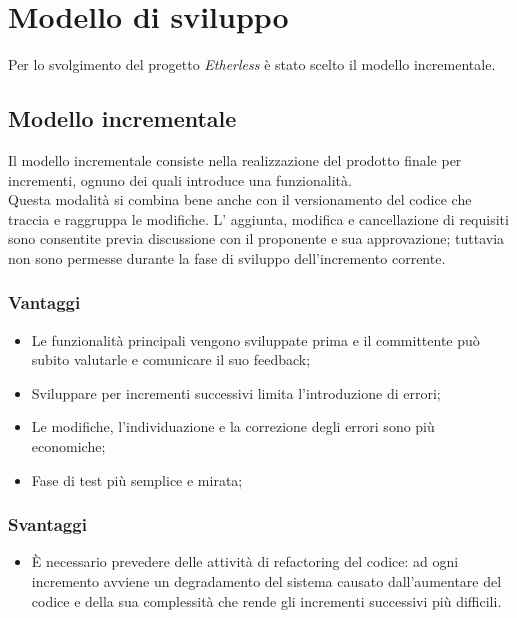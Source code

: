\section{Modello di sviluppo}
Per lo svolgimento del progetto \textit{Etherless} è stato scelto il modello incrementale.

\subsection{Modello incrementale}
Il modello incrementale consiste nella realizzazione del prodotto finale per incrementi, ognuno dei quali introduce una funzionalità. \\Questa modalità si combina bene anche con il versionamento del codice che traccia e raggruppa le modifiche. L' aggiunta, modifica e cancellazione di requisiti sono consentite previa discussione con il proponente e sua approvazione; tuttavia non sono permesse durante la fase di sviluppo dell'incremento corrente.
\subsubsection{Vantaggi}
\begin{itemize}
	\item Le funzionalità principali vengono sviluppate prima e il committente può subito valutarle e comunicare il suo feedback;
	\item Sviluppare per incrementi successivi limita l'introduzione di errori;
	\item Le modifiche, l’individuazione e la correzione degli errori sono più economiche;
	\item Fase di test più semplice e mirata;
\end{itemize}
\subsubsection{Svantaggi}
\begin{itemize}
	\item È necessario prevedere delle attività di refactoring del codice: ad ogni incremento avviene un degradamento del sistema causato dall'aumentare del codice e della sua complessità che rende gli incrementi successivi più difficili.
\end{itemize}